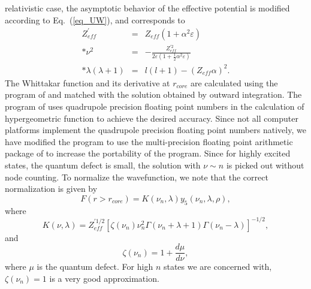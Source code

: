 \documentclass[preprint, floatfix, pra, showpacs, showkeys]{revtex4}
\begin{document}
relativistic case, the asymptotic behavior of the effective potential is
modified according to Eq.~(\ref{eq_UW}), and corresponds to 
\begin{eqnarray}
Z_{eff}^\prime &=& Z_{eff}(1+\alpha^2\varepsilon) \nonumber\\*
\nu^2 &=& -\frac{Z_{eff}^{\prime 2}}{2\varepsilon
\left(1+\frac{1}{2}\alpha^2\varepsilon\right)} \nonumber\\*
\lambda(\lambda+1) &=& l(l+1) - (Z_{eff}\alpha)^2 .
\end{eqnarray}
The Whittakar function and its derivative at $r_{core}$ are calculated
using the program of \textcite{thompson85} and matched with the solution
obtained by outward integration. The program of \textcite{thompson85} uses
quadrupole precision floating point numbers in the calculation of 
hypergeometric function to achieve the desired accuracy. Since not all computer
platforms implement the quadrupole precision floating point numbers natively,
we have modified the program to use the multi-precision floating point
arithmetic package of \textcite{bailey93} to increase the portability of the
program. Since for highly excited states, the quantum defect is 
small, the solution with $\nu \sim n$ is picked out without node counting. To
normalize the wavefunction, we note that the correct normalization is given by
\cite{seaton58}
\begin{equation}
\label{eq_norm}
F(r > r_{core}) = K(\nu_n, \lambda)y_5(\nu_n, \lambda, \rho),
\end{equation}
where 
\begin{equation}
K(\nu,\lambda) =
Z_{eff}^{\prime 1/2}\left[\zeta(\nu_n)\nu_n^2\Gamma(\nu_n+\lambda+1)
\Gamma(\nu_n-\lambda)\right]^{-1/2}, 
\end{equation}
and 
\begin{equation}
\zeta(\nu_n) = 1 + \frac{d\mu}{d\nu},
\end{equation}
where $\mu$ is the quantum defect. For high $n$ states we are concerned with,
$\zeta(\nu_n) = 1$ is a very good approximation.
\end{document}
